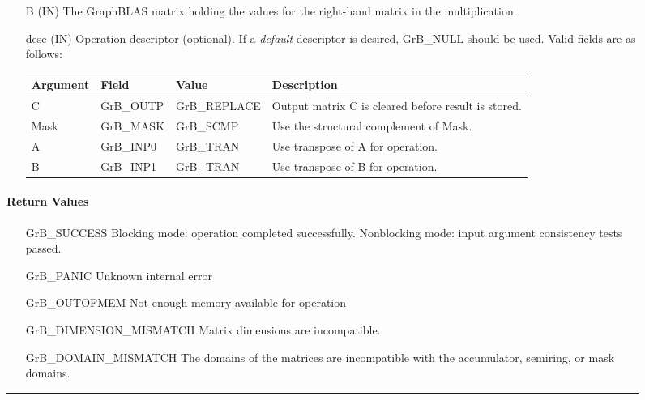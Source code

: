 \begin{figure*}[ht!]
\begin{itemize}[leftmargin=1.1in]
    \item[{\sf B}] ({\sf IN}) The GraphBLAS matrix holding the values
    for the right-hand matrix in the multiplication.

    \item[{\sf desc}] ({\sf IN}) Operation descriptor (optional). If
    a \emph{default} descriptor is desired, {\sf GrB\_NULL} should be
    used. Valid fields are as follows: 

    \begin{tabular}{lllp{2.75in}}
    Argument   & Field           & Value               & Description \\ \hline
    {\sf C}    & {\sf GrB\_OUTP} & {\sf GrB\_REPLACE}  & Output matrix {\sf C} is cleared before result is stored. \\
    {\sf Mask} & {\sf GrB\_MASK} & {\sf GrB\_SCMP}     & Use the structural complement of {\sf Mask}. \\
    {\sf A}    & {\sf GrB\_INP0} & {\sf GrB\_TRAN}     & Use transpose of {\sf A} for operation. \\
    {\sf B}    & {\sf GrB\_INP1} & {\sf GrB\_TRAN}     & Use transpose of {\sf B} for operation. \\
    \end{tabular}
\end{itemize}

\paragraph{Return Values}

\begin{itemize}[leftmargin=2.1in]

	\item[{\sf GrB\_SUCCESS}]	Blocking mode: operation
	completed successfully. Nonblocking mode: input argument consistency tests
	passed.  

	\item[{\sf GrB\_PANIC}]		      Unknown internal error

	\item[{\sf GrB\_OUTOFMEM}]	      Not enough memory available
	for operation

	\item[{\sf GrB\_DIMENSION\_MISMATCH}] Matrix dimensions are
	incompatible.

	\item[{\sf GrB\_DOMAIN\_MISMATCH}]    The domains of the matrices are incompatible with the 
	accumulator, semiring, or mask domains.

\end{itemize}

\hrule
\end{figure*}
